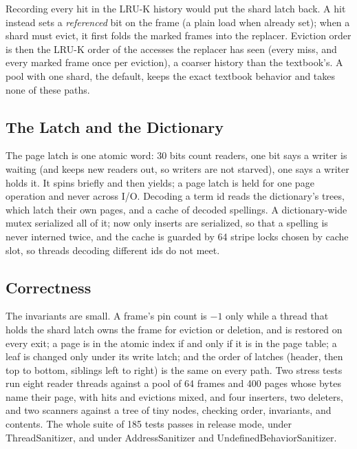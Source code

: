 Recording every hit in the LRU-K history would put the shard latch back.
A hit instead sets a \emph{referenced} bit on the frame (a plain load when
already set); when a shard must evict, it first folds the marked frames into
the replacer.
Eviction order is then the LRU-K order of the accesses the replacer has seen
(every miss, and every marked frame once per eviction), a coarser history than
the textbook's.
A pool with one shard, the default, keeps the exact textbook behavior and
takes none of these paths.

\subsection{The Latch and the Dictionary}

The page latch is one atomic word: 30 bits count readers, one bit says a
writer is waiting (and keeps new readers out, so writers are not starved), one
says a writer holds it.
It spins briefly and then yields; a page latch is held for one page operation
and never across I/O.
Decoding a term id reads the dictionary's trees, which latch their own
pages, and a cache of decoded spellings.
A dictionary-wide mutex serialized all of it; now only inserts are
serialized, so that a spelling is never interned twice, and the cache is
guarded by 64 stripe locks chosen by cache slot, so threads decoding
different ids do not meet.

\subsection{Correctness}

The invariants are small.
A frame's pin count is $-1$ only while a thread that holds the shard latch
owns the frame for eviction or deletion, and is restored on every exit; a page
is in the atomic index if and only if it is in the page table; a leaf is
changed only under its write latch; and the order of latches (header, then
top to bottom, siblings left to right) is the same on every path.
Two stress tests run eight reader threads against a pool of 64 frames and 400
pages whose bytes name their page, with hits and evictions mixed, and four
inserters, two deleters, and two scanners against a tree of tiny nodes,
checking order, invariants, and contents.
The whole suite of 185 tests passes in release mode, under ThreadSanitizer,
and under AddressSanitizer and UndefinedBehaviorSanitizer.

